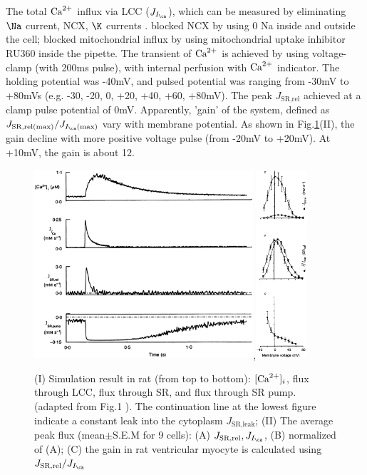 The total ${\text{Ca}^{2+}}$ influx via LCC ($J_{I_\ca}$), which can be measured by
eliminating $\Na$ current, NCX, $\K$ currents \citep{balke1994}.
\citep{shannon2000pfs} blocked NCX by using 0 Na inside and outside the cell;
blocked mitochondrial influx by using mitochondrial uptake inhibitor RU360
inside the pipette. The transient of ${\text{Ca}^{2+}}$ is achieved by using voltage-clamp
(with 200ms pulse), with internal perfusion with ${\text{Ca}^{2+}}$ indicator.  The holding
potential was -40mV, and pulsed potential was ranging from -30mV to +80mVs (e.g.
-30, -20, 0, +20, +40, +60, +80mV). The peak $J_\text{SR,rel}$ achieved at a
clamp pulse potential of 0mV. Apparently, 'gain' of the system, defined as
$J_\text{SR,rel(max)}/J_{I_\ca(\max)}$ vary with membrane potential. As shown in
Fig.\ref{fig:Wier1994_Fig1}(II), the gain decline with more positive voltage
pulse (from -20mV to +20mV). At +10mV, the gain is about 12.


\begin{figure}[hbt]
  \centerline{\includegraphics[height=7cm]{./images/Wier1994_Fig1.eps},\includegraphics[height=7cm]{./images/Wier1994_Fig3.eps}}
  \caption{ (I) Simulation result in rat (from top to bottom): $[{\text{Ca}^{2+}}]_i$, flux
  through LCC, flux through SR, and flux through SR pump. (adapted from Fig.1
  \citep{wier1994lce}). The continuation line at the lowest figure indicate a
  constant leak into the cytoplasm $J_\text{SR,leak}$; (II) The average peak
  flux (mean$\pm$S.E.M for 9 cells): (A) $J_\text{SR,rel},J_{I_\ca}$, (B)
  normalized of (A); (C) the gain in rat ventricular myocyte is calculated using
  $J_\text{SR,rel}/J_{I_\ca}$}
  \label{fig:Wier1994_Fig1}
\end{figure}

